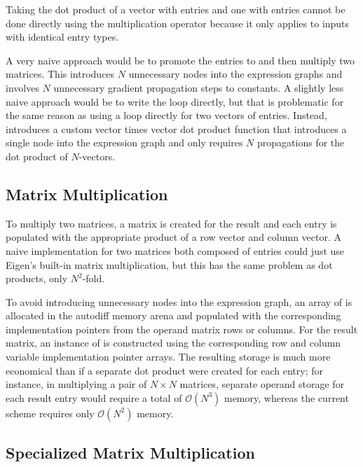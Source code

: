 \documentclass[10pt]{article}
\begin{document}
Taking the dot product of a vector with  entries and one
with  entries cannot be done directly using the 
multiplication operator because it only applies to inputs with
identical entry types.  

A very naive approach would be to promote the  entries to
 and then multiply two  matrices.  This introduces
$N$ unnecessary nodes into the expression graphs and involves $N$
unnecessary gradient propagation steps to constants.  A slightly less
naive approach would be to write the loop directly, but that
is problematic for the same reason as using a loop directly for two
vectors of  entries.  Instead,  introduces
a custom  vector times  vector dot product
function that introduces a single node into the expression graph and
only requires $N$ propagations for the dot product of $N$-vectors.


\subsection{Matrix Multiplication}

To multiply two matrices, a matrix is created for the result and each
entry is populated with the appropriate product of a row vector and
column vector.  A naive implementation for two matrices both composed
of  entries could just use Eigen's built-in matrix
multiplication, but this has the same problem as dot products, only
$N^2$-fold.

To avoid introducing unnecessary nodes into the expression graph, an
array of  is allocated in the autodiff memory arena and
populated with the corresponding implementation pointers from the
operand matrix rows or columns.  For the result matrix, an instance of
 is constructed using the corresponding row
and column variable implementation pointer arrays.  The resulting
storage is much more economical than if a separate dot product were
created for each entry; for instance, in multiplying a pair of $N
\times N$ matrices, separate operand storage for each result entry
would require a total of $\mathcal{O}(N^3)$ memory, whereas the
current scheme requires only $\mathcal{O}(N^2)$ memory.


\subsection{Specialized Matrix Multiplication}
\end{document}
